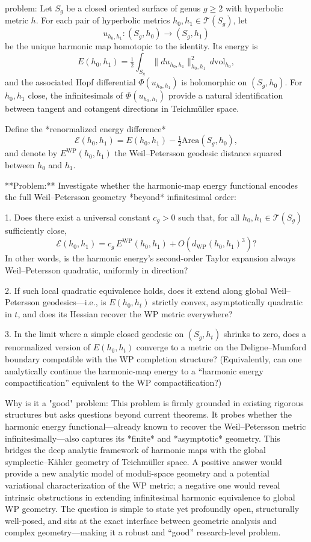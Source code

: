 problem:  
Let \(S_g\) be a closed oriented surface of genus \(g\ge2\) with hyperbolic metric \(h\).  
For each pair of hyperbolic metrics \(h_0,h_1 \in \mathcal{T}(S_g)\), let  
\[
u_{h_0,h_1}\colon (S_g,h_0)\to (S_g,h_1)
\]
be the unique harmonic map homotopic to the identity. Its energy is  
\[
E(h_0,h_1)=\tfrac{1}{2}\int_{S_g}\|du_{h_0,h_1}\|^2_{h_0,h_1}\,d\mathrm{vol}_{h_0},
\]
and the associated Hopf differential \(\Phi(u_{h_0,h_1})\) is holomorphic on \((S_g,h_0)\).  
For \(h_0,h_1\) close, the infinitesimals of \(\Phi(u_{h_0,h_1})\) provide a natural identification between tangent and cotangent directions in Teichmüller space.

Define the *renormalized energy difference*
\[
\mathcal{E}(h_0,h_1)=E(h_0,h_1)-\tfrac{1}{2}\mathrm{Area}(S_g,h_0),
\]
and denote by \(E^\mathrm{WP}(h_0,h_1)\) the Weil–Petersson geodesic distance squared between \(h_0\) and \(h_1\).

**Problem:**  
Investigate whether the harmonic-map energy functional encodes the full Weil–Petersson geometry *beyond* infinitesimal order:

1. Does there exist a universal constant \(c_g>0\) such that, for all \(h_0,h_1\in\mathcal{T}(S_g)\) sufficiently close,
   \[
   \mathcal{E}(h_0,h_1)=c_g\,E^\mathrm{WP}(h_0,h_1)+O(d_\mathrm{WP}(h_0,h_1)^3)?
   \]
   In other words, is the harmonic energy’s second-order Taylor expansion always Weil–Petersson quadratic, uniformly in direction?

2. If such local quadratic equivalence holds, does it extend along global Weil–Petersson geodesics—i.e., is \(E(h_0,h_t)\) strictly convex, asymptotically quadratic in \(t\), and does its Hessian recover the WP metric everywhere?

3. In the limit where a simple closed geodesic on \((S_g,h_t)\) shrinks to zero, does a renormalized version of \(E(h_0,h_t)\) converge to a metric on the Deligne–Mumford boundary compatible with the WP completion structure?  
   (Equivalently, can one analytically continue the harmonic-map energy to a “harmonic energy compactification” equivalent to the WP compactification?)

Why is it a "good" problem:  
This problem is firmly grounded in existing rigorous structures but asks questions beyond current theorems. It probes whether the harmonic energy functional—already known to recover the Weil–Petersson metric infinitesimally—also captures its *finite* and *asymptotic* geometry. This bridges the deep analytic framework of harmonic maps with the global symplectic–Kähler geometry of Teichmüller space. A positive answer would provide a new analytic model of moduli-space geometry and a potential variational characterization of the WP metric; a negative one would reveal intrinsic obstructions in extending infinitesimal harmonic equivalence to global WP geometry. The question is simple to state yet profoundly open, structurally well-posed, and sits at the exact interface between geometric analysis and complex geometry—making it a robust and “good” research-level problem.